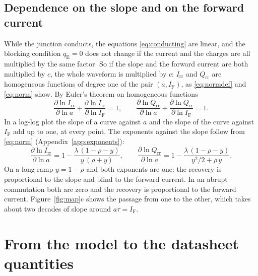 \documentclass[10pt,a4paper]{scrartcl}
\newcommand{\IF}{I_\mathrm{F}}
\newcommand{\Irr}{I_\mathrm{rr}}
\newcommand{\Qrr}{Q_\mathrm{rr}}
\newcommand{\qE}{q_\mathrm{E}}
\begin{document}
\subsection{Dependence on the slope and on the forward current}
\label{sec:exponents}
While the junction conducts, the equations \eqref{eq:conducting} are linear, and the blocking condition $\qE = 0$ does not change if the current and the charges are all multiplied by the same factor. So if the slope and the forward current are both multiplied by $c$, the whole waveform is multiplied by $c$: $\Irr$ and $\Qrr$ are homogeneous functions of degree one of the pair $(a, \IF)$, as \eqref{eq:normdef} and \eqref{eq:norm} show. By Euler's theorem on homogeneous functions
\begin{equation}
\frac{\partial \ln \Irr}{\partial \ln a} + \frac{\partial \ln \Irr}{\partial \ln \IF} = 1 , \qquad
\frac{\partial \ln \Qrr}{\partial \ln a} + \frac{\partial \ln \Qrr}{\partial \ln \IF} = 1 .
\label{eq:euler}
\end{equation}
In a log-log plot the slope of a curve against $a$ and the slope of the curve against $\IF$ add up to one, at every point. The exponents against the slope follow from \eqref{eq:norm} (Appendix~\ref{app:exponents}):
\begin{equation}
\frac{\partial \ln \Irr}{\partial \ln a} = 1 - \frac{\lambda\,(1-\rho-y)}{y\,(\rho+y)} , \qquad
\frac{\partial \ln \Qrr}{\partial \ln a} = 1 - \frac{\lambda\,(1-\rho-y)}{y^2/2+\rho\,y} .
\label{eq:exponents}
\end{equation}
On a long ramp $y = 1-\rho$ and both exponents are one: the recovery is proportional to the slope and blind to the forward current. In an abrupt commutation both are zero and the recovery is proportional to the forward current. Figure~\ref{fig:map}c shows the passage from one to the other, which takes about two decades of slope around $a\tau = \IF$.

\section{From the model to the datasheet quantities}
\label{sec:direct}
\end{document}
